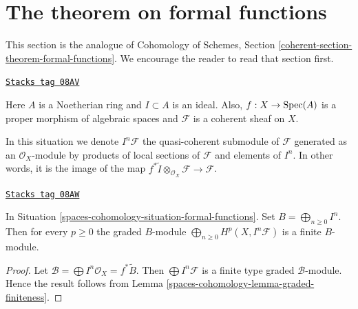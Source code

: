 \section{The theorem on formal functions}
\label{spaces-cohomology-section-theorem-formal-functions}
This section is the analogue of
Cohomology of Schemes, Section \ref{coherent-section-theorem-formal-functions}.
We encourage the reader to read that section first.

\begin{definition}
\label{spaces-cohomology-situation-formal-functions}
\href{https://stacks.math.columbia.edu/tag/08AV}{\texttt{Stacks tag 08AV}}

Here $A$ is a Noetherian ring and $I \subset A$ is an ideal.
Also, $f : X \to \operatorname{Spec}(A)$ is a proper morphism of algebraic spaces
and $\mathcal{F}$ is a coherent sheaf on $X$.
\end{definition}

In this situation we denote $I^n\mathcal{F}$ the quasi-coherent
submodule of $\mathcal{F}$ generated as an $\mathcal{O}_X$-module
by products of local sections of $\mathcal{F}$ and elements of $I^n$.
In other words, it is the image of the map
$f^*\widetilde{I} \otimes_{\mathcal{O}_X} \mathcal{F} \to \mathcal{F}$.

\begin{lemma}
\label{spaces-cohomology-lemma-cohomology-powers-ideal-times-F}
\href{https://stacks.math.columbia.edu/tag/08AW}{\texttt{Stacks tag 08AW}}

In Situation \ref{spaces-cohomology-situation-formal-functions}.
Set $B = \bigoplus_{n \geq 0} I^n$.
Then for every $p \geq 0$ the graded $B$-module
$\bigoplus_{n \geq 0} H^p(X, I^n\mathcal{F})$ is
a finite $B$-module.
\end{lemma}

\begin{proof}
Let $\mathcal{B} = \bigoplus I^n\mathcal{O}_X = f^*\widetilde{B}$.
Then $\bigoplus I^n\mathcal{F}$ is a finite type
graded $\mathcal{B}$-module. Hence the result follows
from Lemma \ref{spaces-cohomology-lemma-graded-finiteness}.
\end{proof}

